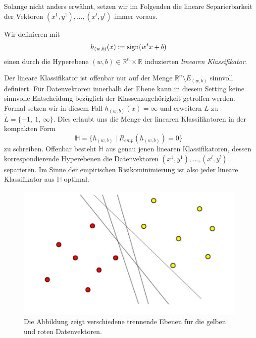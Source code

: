 Solange nicht anders erwähnt, setzen wir im Folgenden die lineare Separierbarkeit der Vektoren $(x^1,y^1),...,(x^l,y^l)$ immer voraus. 

\begin{definition}
	\label{def-lin-klass}
	Wir definieren mit
	\begin{equation}
	h_{(w,b)}(x) := \operatorname{sign}(w^t  x + b)
	\end{equation} 
	einen durch die Hyperebene $(w,b) \in \mathbb{R}^n \times \mathbb{R}$ induzierten \emph{linearen Klassifikator}.
\end{definition} 

Der lineare Klassifikator ist offenbar nur auf der Menge $\mathbb{R}^n \setminus E_{(w,b)}$ sinnvoll definiert. Für Datenvektoren innerhalb der Ebene kann in diesem Setting keine sinnvolle Entscheidung bezüglich der Klassenzugehörigkeit getroffen werden. Formal setzen wir in diesem Fall $h_{(w,b)}(x)=\infty$ und erweitern $L$ zu $\tilde{L}=\{ -1,\ 1,\ \infty \}$. Dies erlaubt uns die Menge der linearen Klassifikatoren in der kompakten Form 
\begin{equation}
	\label{equ-H}
	\mathbb{H} = \{ h_{(w,b)} \mid R_{emp}(h_{(w,b)}) = 0 \}
\end{equation}
zu schreiben. Offenbar besteht $\mathbb{H}$ aus genau jenen linearen Klassifikatoren, dessen korrespondierende Hyperebenen die Datenvektoren $(x^1,y^1),...,(x^l,y^l)$ separieren. Im Sinne der empirischen Risikominimierung ist also jeder lineare Klassifikator aus $\mathbb{H}$ optimal.  \\

\begin{figure}
	\begin{center}
		\includegraphics{abbildungen/trennungen.PNG}
	\end{center}
	\caption{Die Abbildung zeigt verschiedene trennende Ebenen für die gelben und roten Datenvektoren.}
	\label{pic-sep-hyp}
\end{figure}

